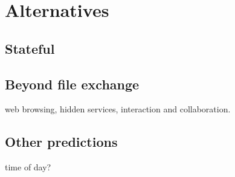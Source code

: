 



\section{Alternatives}%
\label{Alternatives}

\subsection{Stateful \name}
\subsection{Beyond file exchange} web browsing, hidden services,
interaction and collaboration.
\subsection{Other predictions} time of day? 
